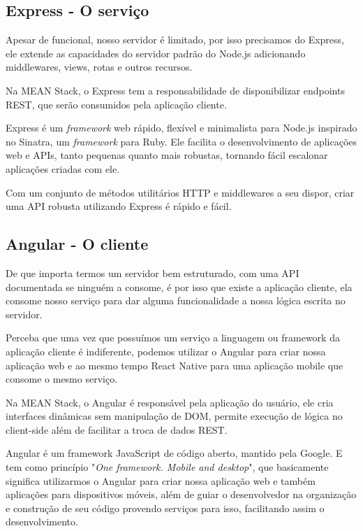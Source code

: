 \documentclass[
    article,            %
    11pt,               %
    oneside,            %
    a4paper,            %
    english,            %
    brazil,             %
    sumario=tradicional
    ]{abntex2}
\begin{document}
\subsection{Express - O serviço}

Apesar de funcional, nosso servidor é limitado, por isso precisamos do Express, ele extende as capacidades do servidor padrão do Node.js adicionando middlewares, views, rotas e outros recursos.

Na MEAN Stack, o Express tem a responsabilidade de disponibilizar endpoints REST, que serão consumidos pela aplicação cliente.

Express é um \textit{framework} web rápido, flexível e minimalista para Node.js inspirado no Sinatra, um \textit{framework} para Ruby. Ele facilita o desenvolvimento de aplicações web e APIs, tanto pequenas quanto mais robustas, tornando fácil escalonar aplicações criadas com ele.

Com um conjunto de métodos utilitários HTTP e middlewares a seu dispor, criar uma API robusta utilizando Express é rápido e fácil.

\subsection{Angular - O cliente}

De que importa termos um servidor bem estruturado, com uma API documentada se ninguém a consome, é por isso que existe a aplicação cliente, ela consome nosso serviço para dar alguma funcionalidade a nossa lógica escrita no servidor.

Perceba que uma vez que possuímos um serviço a linguagem ou framework da aplicação cliente é indiferente, podemos utilizar o Angular para criar nossa aplicação web e ao mesmo tempo React Native para uma aplicação mobile que consome o mesmo serviço.

Na MEAN Stack, o Angular é responsável pela aplicação do usuário, ele cria interfaces dinâmicas sem manipulação de DOM, permite execução de lógica no client-side além de facilitar a troca de dados REST.

Angular é um framework JavaScript de código aberto, mantido pela Google. E tem como princípio "\textit{One framework. Mobile and desktop}", que basicamente significa utilizarmos o Angular para criar nossa aplicação web e também aplicações para dispositivos móveis, além de guiar o desenvolvedor na organização e construção de seu código provendo serviços para isso, facilitando assim o desenvolvimento.
\end{document}
